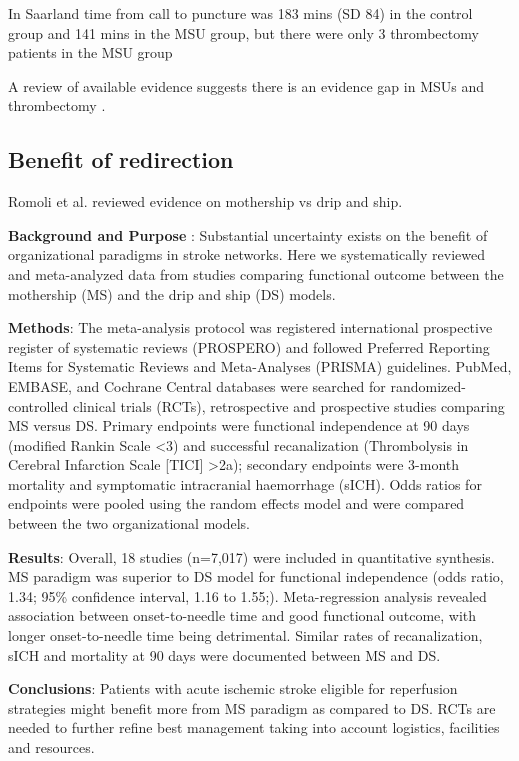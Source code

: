 In Saarland \cite{helwig_prehospital_2019} time from call to puncture was 183 mins (SD 84) in the control group and 141 mins in the MSU group, but there were only 3 thrombectomy patients in the MSU group


A review of available evidence suggests there is an evidence gap in MSUs and thrombectomy \cite{navi_mobile_2022}.

\subsection{Benefit of redirection}

Romoli et al. \cite{romoli_mothership_2020} reviewed evidence on mothership vs drip and ship. 

\textbf{Background and Purpose} : Substantial uncertainty exists on the benefit of organizational paradigms in stroke networks. Here we systematically reviewed and meta-analyzed data from studies comparing functional outcome between the mothership (MS) and the drip and ship (DS) models.

\textbf{Methods}: The meta-analysis protocol was registered international prospective register of systematic reviews (PROSPERO) and followed Preferred Reporting Items for Systematic Reviews and Meta-Analyses (PRISMA) guidelines. PubMed, EMBASE, and Cochrane Central databases were searched for randomized-controlled clinical trials (RCTs), retrospective and prospective studies comparing MS versus DS. Primary endpoints were functional independence at 90 days (modified Rankin Scale <3) and successful recanalization (Thrombolysis in Cerebral Infarction Scale [TICI] >2a); secondary endpoints were 3-month mortality and symptomatic intracranial haemorrhage (sICH). Odds ratios for endpoints were pooled using the random effects model and were compared between the two organizational models.

\textbf{Results}:  Overall, 18 studies (n=7,017) were included in quantitative synthesis. MS paradigm was superior to DS model for functional independence (odds ratio, 1.34; 95\% confidence interval, 1.16 to 1.55;). Meta-regression analysis revealed association between onset-to-needle time and good functional outcome, with longer onset-to-needle time being detrimental. Similar rates of recanalization, sICH and mortality at 90 days were documented between MS and DS.

\textbf{Conclusions}: Patients with acute ischemic stroke eligible for reperfusion strategies might benefit more from MS paradigm as compared to DS. RCTs are needed to further refine best management taking into account logistics, facilities and resources.


